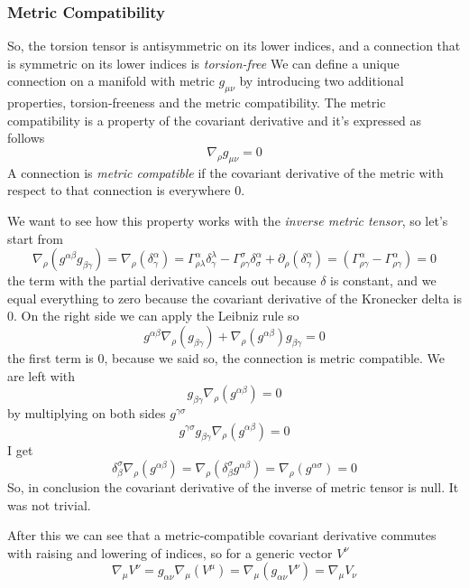 \subsubsection{Metric Compatibility}
So, the torsion tensor is antisymmetric on its lower indices, and a connection that is symmetric on its lower indices is \emph{torsion-free}
We can define a unique connection on a manifold with metric $g_{\mu \nu }$ by introducing two additional properties, torsion-freeness and the metric compatibility.
The metric compatibility is a property of the covariant derivative and it's expressed as follows
\[
\nabla_{\rho } g_{\mu \nu } = 0
\]
A connection is \emph{metric compatible} if the covariant derivative of the metric with respect to that connection is everywhere 0. \par
We want to see how this property works with the \emph{inverse metric tensor}, so let's start from
\begin{equation}
\nabla _{\rho } \left( g^{\alpha \beta } g_{\beta  \gamma } \right) =\nabla _{\rho } \left( \delta ^{\alpha }_{\gamma }  \right) = \Gamma ^{\alpha }_{\rho \lambda  }\delta^{\lambda }_{\gamma } - \Gamma ^{\sigma  }_{\rho \gamma }\delta^{\alpha }_{\sigma } + \partial_{\rho }\left( \delta ^{\alpha }_{\gamma } \right) = \left( \Gamma ^{\alpha }_{\rho  \gamma } - \Gamma ^{\alpha }_{\rho  \gamma } \right) = 0
\end{equation}
the term with the partial derivative cancels out because $\delta $ is constant, and we equal everything to zero because the covariant derivative of the Kronecker delta is 0. On the right side we can apply the Leibniz rule so
\begin{equation}
g^{\alpha \beta }\nabla _{\rho }\left( g_{\beta \gamma } \right) + \nabla _{\rho }\left( g^{\alpha \beta } \right)g_{\beta \gamma } = 0
\end{equation}
the first term is 0, because we said so, the connection is metric compatible. We are left with
\[
g_{\beta  \gamma }\nabla _{\rho }\left( g^{\alpha \beta } \right) = 0
\]
by multiplying on both sides $g^{\gamma \sigma }$
\[
g^{\gamma \sigma } g_{\beta \gamma } \nabla _{\rho } \left( g^{\alpha \beta } \right) =0
\]
I get
\[
\delta ^{\sigma }_{\beta }\nabla _{\rho }\left( g^{\alpha \beta } \right) = \nabla _{\rho }\left( \delta ^{\sigma }_{\beta } g^{\alpha \beta } \right) = \nabla _{\rho }\left( g^{\alpha \sigma } \right) = 0
\]
So, in conclusion the covariant derivative of the inverse of metric tensor is null. It was not trivial.

After this we can see that a metric-compatible covariant derivative commutes with raising and lowering of indices, so for a generic vector $V^{\nu }$
\[
\nabla _{\mu }V^{\nu } = g_{\alpha \nu }\nabla _{\mu }\left( V^{\mu } \right) = \nabla _{\mu }\left( g_{\alpha \nu }V^{\nu } \right) = \nabla _{\mu }V_{\nu }
\]

